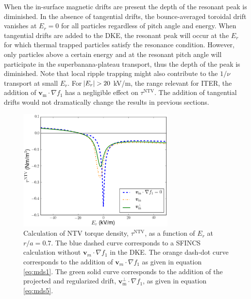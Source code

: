 \documentclass[aip, pop, preprint]{revtex4-1}
\numberwithin{figure}{section}
\numberwithin{equation}{section}
\begin{document}
When the in-surface magnetic drifts are present the depth of the resonant peak is diminished. In the absence of tangential drifts, the bounce-averaged toroidal drift vanishes at $E_r = 0$ for all particles regardless of pitch angle and energy. When tangential drifts are added to the DKE, the resonant peak will occur at the $E_r$ for which thermal trapped particles satisfy the resonance condition. However, only particles above a certain energy and at the resonant pitch angle will participate in the superbanana-plateau transport, thus the depth of the peak is diminished. Note that local ripple trapping might also contribute to the $1/\nu$ transport at small $E_r$. For $\abs{E_r} > 20$ kV/m, the range relevant for ITER, the addition of $\bm{v}_{\mathrm{m}}\cdot \nabla f_1$ has a negligible effect on $\tau^{\mathrm{NTV}}$. The addition of tangential drifts would not dramatically change the results in previous sections.  

\begin{figure}[h!]
\centering
\includegraphics[width=0.7\textwidth]{figure13.eps}
\caption{\label{fig:driftschemes} Calculation of NTV torque density, $\tau^{\mathrm{NTV}}$, as a function of $E_r$ at $r/a = 0.7$. The blue dashed curve corresponds to a SFINCS calculation without $\bm{v}_m \cdot \nabla f_1$ in the DKE. The orange dash-dot curve corresponds to the addition of $\bm{v}_m \cdot \nabla f_1$ as given in equation \ref{eq:mds1}. The green solid curve corresponds to the addition of the projected and regularized drift, $\bm{v}^{\perp}_{\text{m}} \cdot \nabla f_1$, as given in equation \ref{eq:mds5}. }
\end{figure}
\end{document}
